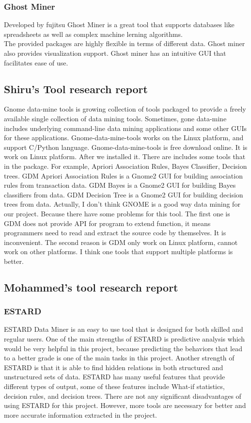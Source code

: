 \documentclass[12pt]{article}
\begin{document}
	\subsubsection{Ghost Miner} \label{ghstm}
	Developed by fujitsu Ghost Miner is a great tool that supports databases like spreadsheets as well as complex machine lerning algorithms. \\
	The provided packages are highly flexible in terms of different data. Ghost miner also provides visualization support. Ghost miner has an intuitive GUI that facilitates ease of use.
	\subsection{Shiru's Tool research report} \label{app_shi}
	Gnome data-mine tools is growing collection of tools packaged to provide a freely available single collection of data mining tools. Sometimes, gone data-mine includes underlying command-line data mining applications and some other GUIs for these applications.	Gnome-data-mine-tools works on the Linux platform, and support C/Python language. Gnome-data-mine-tools is free download online. It is work on Linux platform. After we installed it. There are includes some tools that in the package. For example, Apriori Association Rules, Bayes Classifier, Decision trees. GDM Apriori Association Rules is a Gnome2 GUI for building association rules from transaction data. GDM Bayes is a Gnome2 GUI for building Bayes classifiers from data. GDM Decision Tree is a Gnome2 GUI for building decision trees from data.
	Actually, I don’t think GNOME is a good way data mining for our project. Because there have some problems for this tool. The first one is GDM does not provide API for program to extend function, it means programmers need to read and extract the source code by themselves. It is inconvenient. The second reason is GDM only work on Linux platform, cannot work on other platforms. I think one tools that support multiple platforms is better.
	\subsection{Mohammed's tool research report} \label{app_mo}
	\subsubsection{ESTARD} \label{est}
	ESTARD Data Miner is an easy to use tool that is designed for both skilled and regular users. One of the main strengths of ESTARD is predictive analysis which would be very helpful in this project, because predicting the behaviors that lead to a better grade is one of the main tasks in this project. Another strength of ESTARD is that it is able to find hidden relations in both structured and unstructured sets of data. ESTARD has many useful features that provide different types of output, some of these features include What-if statistics, decision rules, and decision trees.  There are not any significant disadvantages of using ESTARD for this project. However, more tools are necessary for better and more accurate information extracted in the project.
\end{document}
